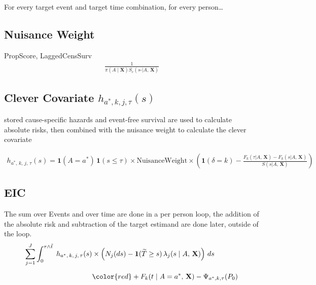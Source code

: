 \documentclass{report}
\newcommand{\1}{\ensuremath{\mathbf{1}}}
\newcommand{\T}{\ensuremath{\widetilde{T}}}
\newcommand{\X}{\ensuremath{\mathbf{X}}}
\newcommand{\AX}{\ensuremath{\mid A,\,\mathbf{X}}}
\newcommand{\trt}{\ensuremath{a^*}}
\newcommand{\tk}{\ensuremath{\tau}}
\newcommand{\jj}{\ensuremath{k}}
\newcommand{\g}{\ensuremath{\pi}}
\begin{document}
For every target event and target time combination, for every person\ldots{}

\subsection*{Nuisance Weight}
\label{sec:org3c1358a}
PropScore, LaggedCensSurv
\begin{align*}
     \frac{1}{\g(A \mid \X) S_c(s\text{-} \AX)}
\end{align*}

\subsection*{Clever Covariate \(h_{\trt, \jj, j, \tk}(s)\)}
\label{sec:org7b197ce}
stored cause-specific hazards and event-free survival are used to calculate absolute risks, then combined with the nuisance weight to calculate the clever covariate

\begin{align*}
    h_{\trt,\, \jj,\, j,\, \tk}(s) = \1(A = \trt)\, \1(s \leq \tk)
\times \text{NuisanceWeight} \times \left(\1(\delta = \jj) - \frac{F_\jj(\tk \AX) - F_\jj(s \AX)}{S(s \AX)}\right)
\end{align*}

\subsection*{EIC}
\label{sec:org37b6b17}
The sum over Events and over time are done in a per person loop, the addition of the absolute risk and subtraction of the target estimand are done later, outside of the loop.
\begin{align*}
    \sum_{j = 1}^{J} \int_{0}^{\tk \wedge \Tilde{t}} \;  h_{\trt,\, \jj,\, j,\, \tk}(s) &\times \left(N_j(ds) - \1(\T \geq s)\,\lambda_j(s \AX)\right) \,ds\\[2mm]
    &{\color{red}+ F_\jj(t \mid A = \trt,\,\X) - \Psi_{\trt, \jj, \tk}(P_0)}
\end{align*}
\end{document}
